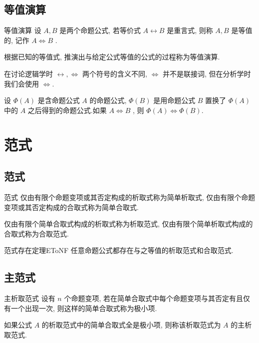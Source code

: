 \documentclass[cn,toc=twocol]{elegantbook}
\begin{document}
\subsection{等值演算}

\begin{definition}{等值演算}
设 $A, B$ 是两个命题公式, 若等价式 $A \leftrightarrow B$ 是重言式, 则称 $A, B$ 是等值的, 记作 $A\Leftrightarrow B$ .

根据已知的等值式, 推演出与给定公式等值的公式的过程称为等值演算.
\end{definition}

\begin{remark}
在讨论逻辑学时 $\leftrightarrow, \Leftrightarrow$ 两个符号的含义不同, $\Leftrightarrow$ 并不是联接词, 但在分析学时我们会使用 $\Leftrightarrow$.
\end{remark}


\begin{theorem}{}
设 $\Phi(A)$ 是含命题公式 $A$ 的命题公式, $\Phi(B)$ 是用命题公式 $B$ 置换了 $\Phi(A)$ 中的 $A$ 之后得到的命题公式.如果 $A\Leftrightarrow B$ , 则 $\Phi(A)\Leftrightarrow\Phi(B)$.
\end{theorem}

\section{范式}

\subsection{范式}

\begin{definition}{范式}
仅由有限个命题变项或其否定构成的析取式称为简单析取式, 仅由有限个命题变项或其否定构成的合取式称为简单合取式.

仅由有限个简单合取式构成的析取式称为析取范式, 仅由有限个简单析取式构成的合取式称为合取范式.
\end{definition}

\begin{theorem}{范式存在定理}{EToNF}
任意命题公式都存在与之等值的析取范式和合取范式.
\end{theorem}

\subsection{主范式}
\begin{definition}{主析取范式}
设有 $n$ 个命题变项, 若在简单合取式中每个命题变项与其否定有且仅有一个出现一次, 则这样的简单合取式称为极小项.

如果公式 $A$ 的析取范式中的简单合取式全是极小项, 则称该析取范式为 $A$ 的主析取范式.
\end{definition}
\end{document}
